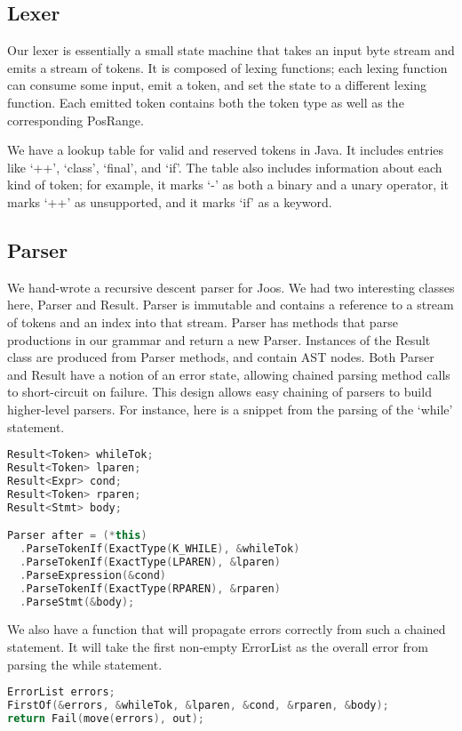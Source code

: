 \documentclass[12pt, titlepage]{article}
\begin{document}
\subsection{Lexer}
Our lexer is essentially a small state machine that takes an input byte stream
and emits a stream of tokens. It is composed of lexing functions; each lexing
function can consume some input, emit a token, and set the state to a different
lexing function. Each emitted token contains both the token type as well as the
corresponding PosRange.

We have a lookup table for valid and reserved tokens in Java. It includes
entries like `++', `class', `final', and `if'. The table also includes
information about each kind of token; for example, it marks `-' as both a
binary and a unary operator, it marks `++' as unsupported, and it marks `if' as
a keyword.

\subsection{Parser}
We hand-wrote a recursive descent parser for Joos. We had two interesting
classes here, Parser and Result. Parser is immutable and contains a reference
to a stream of tokens and an index into that stream. Parser has methods that
parse productions in our grammar and return a new Parser. Instances of the
Result class are produced from Parser methods, and contain AST nodes. Both
Parser and Result have a notion of an error state, allowing chained parsing
method calls to short-circuit on failure. This design allows easy chaining of
parsers to build higher-level parsers. For instance, here is a snippet from the
parsing of the `while' statement.
\begin{lstlisting}[language=c++]
Result<Token> whileTok;
Result<Token> lparen;
Result<Expr> cond;
Result<Token> rparen;
Result<Stmt> body;

Parser after = (*this)
  .ParseTokenIf(ExactType(K_WHILE), &whileTok)
  .ParseTokenIf(ExactType(LPAREN), &lparen)
  .ParseExpression(&cond)
  .ParseTokenIf(ExactType(RPAREN), &rparen)
  .ParseStmt(&body);
\end{lstlisting}

We also have a function that will propagate errors correctly from such a
chained statement. It will take the first non-empty ErrorList as the overall
error from parsing the while statement.
\begin{lstlisting}[language=c++]
ErrorList errors;
FirstOf(&errors, &whileTok, &lparen, &cond, &rparen, &body);
return Fail(move(errors), out);
\end{lstlisting}
\end{document}
